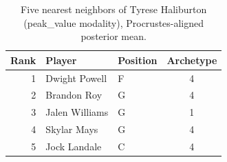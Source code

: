 \begin{table}[htbp]
  \centering\small
  \begin{tabular}{rllc}
    \toprule
    Rank & Player & Position & Archetype \\
    \midrule
    1 & Dwight Powell & F & 4 \\
    2 & Brandon Roy & G & 4 \\
    3 & Jalen Williams & G & 1 \\
    4 & Skylar Mays & G & 4 \\
    5 & Jock Landale & C & 4 \\
    \bottomrule
  \end{tabular}
  \caption{Five nearest neighbors of Tyrese Haliburton (peak_value modality), Procrustes-aligned posterior mean.}
  \label{tab:Tyrese_Haliburton_neighbors_peak_value}
\end{table}

